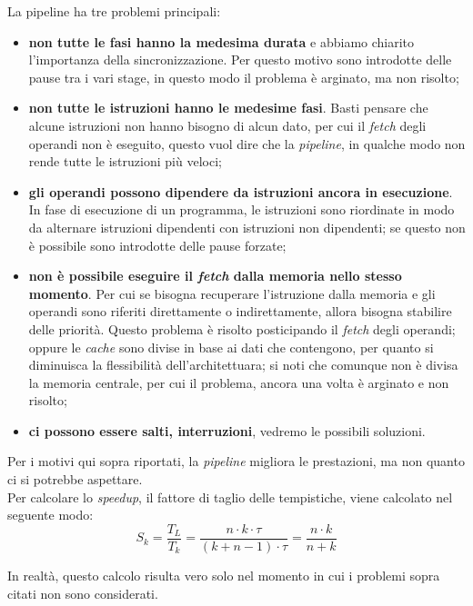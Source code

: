 \documentclass{article}
\begin{document}
La pipeline ha tre problemi principali:
\begin{itemize}
	\item \textbf{non tutte le fasi hanno la medesima durata} e abbiamo chiarito l'importanza della sincronizzazione. Per questo motivo sono introdotte delle pause tra i vari stage, in questo modo il problema è arginato, ma non risolto;

	\item \textbf{non tutte le istruzioni hanno le medesime fasi}. Basti pensare che alcune istruzioni non hanno bisogno di alcun dato, per cui il \textit{fetch} degli operandi non è eseguito, questo vuol dire che la \textit{pipeline}, in qualche modo non rende tutte le istruzioni più veloci;

	\item \textbf{gli operandi possono dipendere da istruzioni ancora in esecuzione}. In fase di esecuzione di un programma, le istruzioni sono riordinate in modo da alternare istruzioni dipendenti con istruzioni non dipendenti; se questo non è possibile sono introdotte delle pause forzate;

	\item \textbf{non è possibile eseguire il \textit{fetch} dalla memoria nello stesso momento}. Per cui se bisogna recuperare l'istruzione dalla memoria e gli operandi sono riferiti direttamente o indirettamente, allora bisogna stabilire delle priorità. Questo problema è risolto posticipando il \textit{fetch} degli operandi; oppure le \textit{cache} sono divise in base ai dati che contengono, per quanto si diminuisca la flessibilità dell'architettuara; si noti che comunque non è divisa la memoria centrale, per cui il problema, ancora una volta è arginato e non risolto;

	\item \textbf{ci possono essere salti, interruzioni}, vedremo le possibili soluzioni.
\end{itemize}

Per i motivi qui sopra riportati, la \textit{pipeline} migliora le prestazioni, ma non quanto ci si potrebbe aspettare.\\
Per calcolare lo \textit{speedup}, il fattore di taglio delle tempistiche, viene calcolato nel seguente modo:
\begin{equation}
	S_k=\frac{T_L}{T_k}=\frac{n\cdot k \cdot \tau}{(k+n-1)\cdot \tau}=\frac{n \cdot k }{n+k}
\end{equation}

In realtà, questo calcolo risulta vero solo nel momento in cui i problemi sopra citati non sono considerati.
\end{document}
